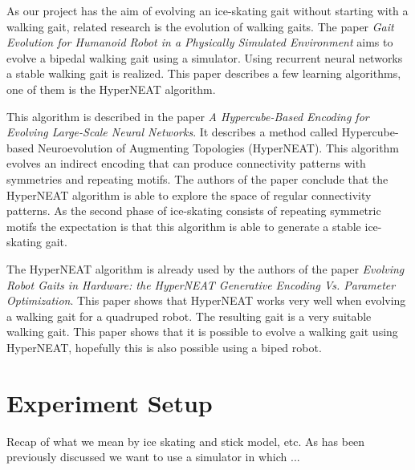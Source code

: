 \documentclass[10pt]{article}
\begin{document}
As our project has the aim of evolving an ice-skating gait without starting with a walking gait, related research is the evolution of walking gaits. The paper \emph{Gait Evolution for Humanoid Robot in a Physically Simulated Environment}\cite{springerlink:10.1007/978-3-642-22907-7_9} aims to evolve a bipedal walking gait using a simulator. Using recurrent neural networks a stable walking gait is realized. This paper describes a few learning algorithms, one of them is the HyperNEAT algorithm.

This algorithm is described in the paper \emph{A Hypercube-Based Encoding for Evolving Large-Scale Neural Networks}\cite{mitpress:hypercubebasedencoding}. It describes a method called Hypercube-based Neuroevolution of Augmenting Topologies (HyperNEAT). This algorithm evolves an indirect encoding that can produce connectivity patterns with symmetries and repeating motifs. The authors of the paper conclude that the HyperNEAT algorithm is able to explore the space of regular connectivity patterns. As the second phase of ice-skating consists of repeating symmetric motifs the expectation is that this algorithm is able to generate a stable ice-skating gait.

The HyperNEAT algorithm is already used by the authors of the paper \emph{Evolving Robot Gaits in Hardware: the HyperNEAT Generative Encoding Vs. Parameter Optimization}\cite{Yosinski2011EvolvedGaits}. This paper shows that HyperNEAT works very well when evolving a walking gait for a quadruped robot. The resulting gait is a very suitable walking gait. This paper shows that it is possible to evolve a walking gait using HyperNEAT, hopefully this is also possible using a biped robot.


\section{Experiment Setup}
Recap of what we mean by ice skating and stick model, etc.
As has been previously discussed we want to use a simulator in which ...
\end{document}
